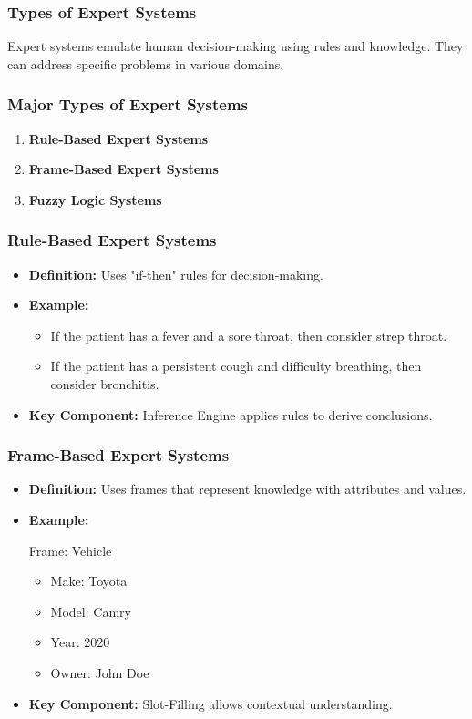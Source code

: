 \documentclass[aspectratio=169]{beamer}
\begin{document}
\begin{frame}[fragile]
    \frametitle{Types of Expert Systems}
    Expert systems emulate human decision-making using rules and knowledge. They can address specific problems in various domains.
\end{frame}

\begin{frame}[fragile]
    \frametitle{Major Types of Expert Systems}
    \begin{enumerate}
        \item \textbf{Rule-Based Expert Systems}
        \item \textbf{Frame-Based Expert Systems}
        \item \textbf{Fuzzy Logic Systems}
    \end{enumerate}
\end{frame}

\begin{frame}[fragile]
    \frametitle{Rule-Based Expert Systems}
    \begin{itemize}
        \item \textbf{Definition:} Uses "if-then" rules for decision-making.
        \item \textbf{Example:}
        \begin{itemize}
            \item If the patient has a fever and a sore throat, then consider strep throat.
            \item If the patient has a persistent cough and difficulty breathing, then consider bronchitis.
        \end{itemize}
        \item \textbf{Key Component:} Inference Engine applies rules to derive conclusions.
    \end{itemize}
\end{frame}

\begin{frame}[fragile]
    \frametitle{Frame-Based Expert Systems}
    \begin{itemize}
        \item \textbf{Definition:} Uses frames that represent knowledge with attributes and values.
        \item \textbf{Example:} 
        \begin{block}{Frame: Vehicle}
            \begin{itemize}
                \item Make: Toyota
                \item Model: Camry
                \item Year: 2020
                \item Owner: John Doe
            \end{itemize}
        \end{block}
        \item \textbf{Key Component:} Slot-Filling allows contextual understanding.
    \end{itemize}
\end{frame}
\end{document}
